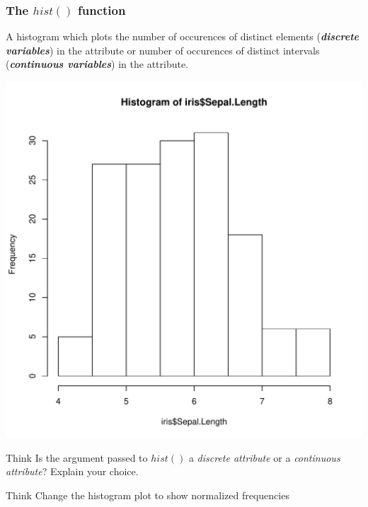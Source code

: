 \subsubsection{The $hist()$ function}
\noindent A histogram which plots the number of occurences of distinct elements (\textbf{\emph{discrete variables}}) in the attribute or number of occurences of distinct intervals (\textbf{\emph{continuous variables}}) in the attribute.
\begin{knitrout}
\color{fgcolor}\begin{kframe}
\begin{alltt}
\hlopt{$}
\end{alltt}
\end{kframe}
\includegraphics[width=\maxwidth]{figure/hist-1} 

\end{knitrout}

\begin{DIY}{Think}
Is the argument passed to $hist()$ a \emph{discrete attribute} or a \emph{continuous attribute}? Explain your choice.
\end{DIY}

\begin{DIY}{Think}
Change the histogram plot to show normalized frequencies
\end{DIY}

